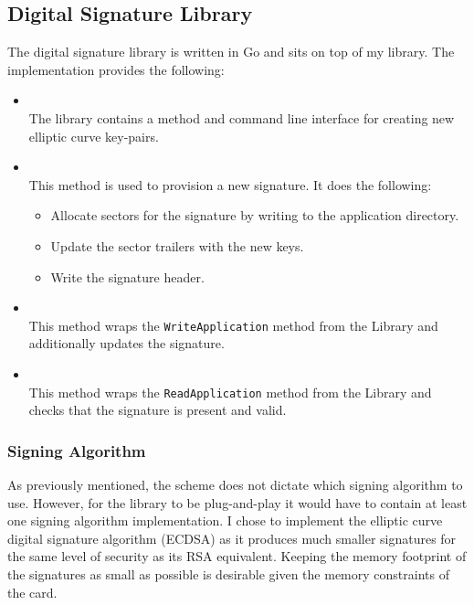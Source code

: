 \documentclass[dissertation.tex]{subfiles}
\begin{document}
  \subsection{Digital Signature Library}
  The digital signature library is written in Go and sits on top of my \mifare{} library. The implementation provides the following:

  \begin{itemize}
    \item {} \\
      The library contains a method and command line interface for creating new elliptic curve key-pairs.

    \item {} \\
      This method is used to provision a new signature. It does the following:
      \begin{itemize}
        \item Allocate sectors for the signature by writing to the application directory.
        \item Update the sector trailers with the new keys.
        \item Write the signature header.
      \end{itemize}
    \item {} \\
      This method wraps the \texttt{WriteApplication} method from the \mifare{} Library and additionally updates the signature.

    \item {} \\
      This method wraps the \texttt{ReadApplication} method from the \mifare{} Library and checks that the signature is present and valid.
  \end{itemize}

  \subsubsection{Signing Algorithm}
  As previously mentioned, the scheme does not dictate which signing algorithm to use. However, for the library to be plug-and-play it would have to contain at least one signing algorithm implementation. I chose to implement the elliptic curve digital signature algorithm (ECDSA) as it produces much smaller signatures for the same level of security as its RSA equivalent. Keeping the memory footprint of the signatures as small as possible is desirable given the memory constraints of the card.
\end{document}
